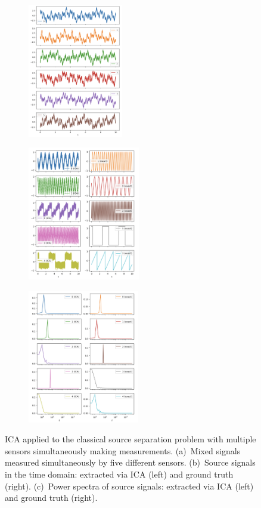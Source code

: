 \documentclass[10pt]{article}
\begin{document}
\begin{figure}[ht]
    \centering
    \hspace{-0.25in}
    \begin{subfigure}{0.3\textwidth}
        \centerline{\includegraphics[height=2.3in]{multi-sensor-ica-mixed-signals}}
        \caption{}
    \end{subfigure}
    \begin{subfigure}{0.3\textwidth}
        \centerline{\includegraphics[height=2.3in]{multi-sensor-ica-source-signals}}
        \caption{}
    \end{subfigure}
    \begin{subfigure}{0.3\textwidth}
        \centerline{\includegraphics[height=2.3in]{multi-sensor-ica-source-power-spectra}}
        \caption{}
    \end{subfigure}

    \vspace{0.1in}
    \begin{minipage}{0.85\linewidth}
    \caption{\label{fig:multi-sensor-ica}
        ICA applied to the classical source separation problem with multiple sensors
        simultaneously making measurements.
        (a)~Mixed signals measured simultaneously by five different sensors.
        (b)~Source signals in the time domain: extracted via ICA (left) and ground truth
        (right).
        (c)~Power spectra of source signals: extracted via ICA (left) and ground truth
        (right).
    }
    \end{minipage}
\end{figure}
\end{document}
